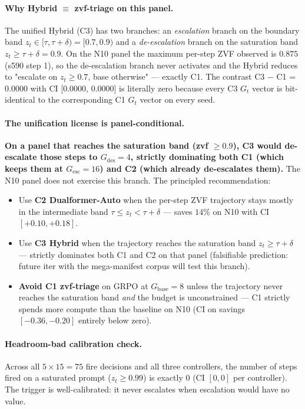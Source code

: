 \documentclass{article}
\begin{document}
\paragraph{Why Hybrid $\equiv$ zvf-triage on this panel.}
The unified Hybrid (C3) has two branches: an \emph{escalation} branch
on the boundary band $z_t \in [\tau, \tau{+}\delta) = [0.7, 0.9)$ and a
\emph{de-escalation} branch on the saturation band $z_t \geq \tau{+}\delta = 0.9$.
On the N10 panel the maximum per-step ZVF observed is $0.875$ (s590
step 1), so the de-escalation branch never activates and the Hybrid
reduces to "escalate on $z_t \geq 0.7$, base otherwise" --- exactly C1.
The contrast C3 $-$ C1 = $0.0000$ with CI [$0.0000$, $0.0000$] is
literally zero because every C3 $G_t$ vector is bit-identical to the
corresponding C1 $G_t$ vector on every seed.

\paragraph{The unification license is panel-conditional.}
\textbf{On a panel that reaches the saturation band (zvf $\geq 0.9$), C3 would de-escalate those steps to $G_{\mathrm{des}}{=}4$, strictly dominating both C1 (which keeps them at $G_{\mathrm{esc}}{=}16$) and C2 (which already de-escalates them).} The N10 panel does not exercise this branch. The principled recommendation:
\begin{itemize}
\item Use \textbf{C2 Dualformer-Auto} when the per-step ZVF trajectory
stays mostly in the intermediate band $\tau \leq z_t < \tau{+}\delta$ ---
saves $14\%$ on N10 with CI $[+0.10, +0.18]$.
\item Use \textbf{C3 Hybrid} when the trajectory reaches the saturation
band $z_t \geq \tau{+}\delta$ --- strictly dominates both C1 and C2 on
that panel (falsifiable prediction: future iter with the
mega-manifest corpus will test this branch).
\item \textbf{Avoid C1 zvf-triage} on GRPO at $G_{\mathrm{base}}{=}8$
unless the trajectory never reaches the saturation band \emph{and}
the budget is unconstrained --- C1 strictly spends more compute than
the baseline on N10 (CI on savings $[-0.36, -0.20]$ entirely below zero).
\end{itemize}

\paragraph{Headroom-bad calibration check.}
Across all $5 \times 15 = 75$ fire decisions and all three controllers,
the number of steps fired on a saturated prompt ($z_t \geq 0.99$) is
exactly $0$ (CI $[0, 0]$ per controller). The trigger is well-calibrated:
it never escalates when escalation would have no value.
\end{document}
